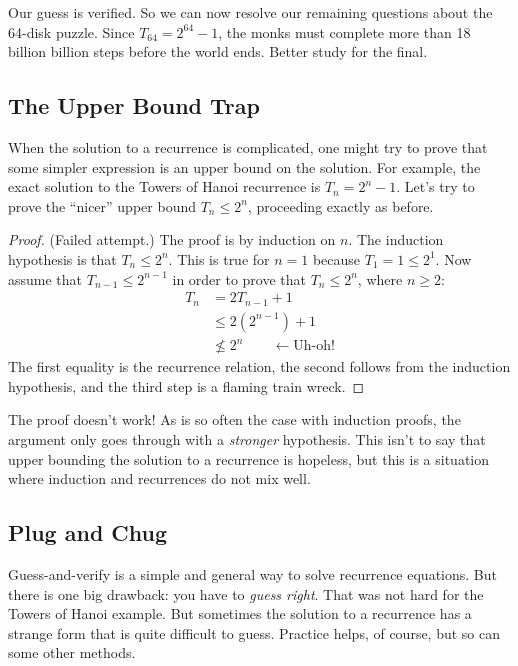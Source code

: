 Our guess is verified.  So we can now resolve our remaining questions
about the 64-disk puzzle.  Since $T_{64} = 2^{64} - 1$, the monks must
complete more than 18 billion billion steps before the world ends.
Better study for the final.

\subsection{The Upper Bound Trap}

When the solution to a recurrence is complicated, one might try to
prove that some simpler expression is an upper bound on the solution.
For example, the exact solution to the Towers of Hanoi recurrence is
$T_n = 2^n - 1$.  Let's try to prove the ``nicer'' upper bound $T_n
\leq 2^n$, proceeding exactly as before.

\begin{proof} (Failed attempt.)
  The proof is by induction on $n$.  The induction hypothesis is that
  $T_n \leq 2^n$.  This is true for $n = 1$ because $T_1 = 1 \leq 2^1$.
  Now assume that $T_{n-1} \leq 2^{n-1}$ in order to prove that $T_n
  \leq 2^n$, where $n \geq 2$:
\begin{align*}
T_n & = 2 T_{n-1} + 1 \\
  & \leq 2 (2^{n-1}) + 1 \\
  & \not\leq 2^n \qquad \leftarrow \text{Uh-oh!}
\end{align*}
The first equality is the recurrence relation, the second follows from
the induction hypothesis, and the third step is a flaming train wreck.
\end{proof}

The proof doesn't work!  As is so often the case with induction
proofs, the argument only goes through with a \emph{stronger}
hypothesis.  This isn't to say that upper bounding the solution to a
recurrence is hopeless, but this is a situation where induction and
recurrences do not mix well.

\subsection{Plug and Chug}

Guess-and-verify is a simple and general way to solve recurrence
equations.  But there is one big drawback: you have to \emph{guess
  right}.  That was not hard for the Towers of Hanoi example.  But
sometimes the solution to a recurrence has a strange form that is
quite difficult to guess.  Practice helps, of course, but so can some
other methods.

